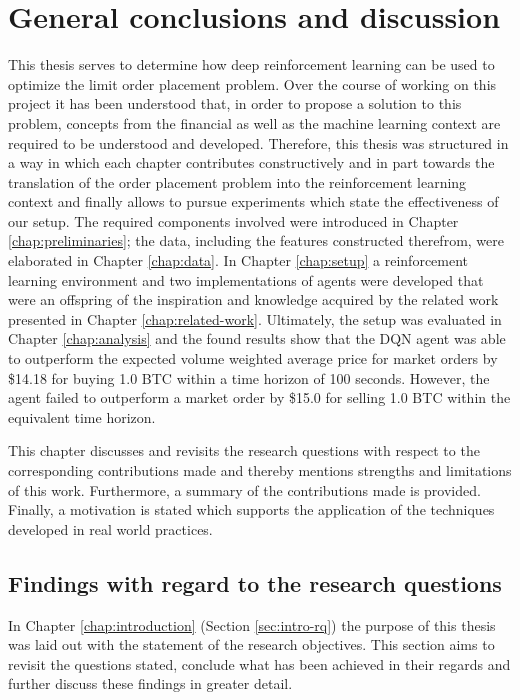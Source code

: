 \chapter{General conclusions and discussion}
\label{chap:discussion}

This thesis serves to determine how deep reinforcement learning can be used to optimize the limit order placement problem.
Over the course of working on this project it has been understood that, in order to propose a solution to this problem, concepts from the financial as well as the machine learning context are required to be understood and developed.
Therefore, this thesis was structured in a way in which each chapter contributes constructively and in part towards the translation of the order placement problem into the reinforcement learning context and finally allows to pursue experiments which state the effectiveness of our setup.
The required components involved were introduced in Chapter \ref{chap:preliminaries}; the data, including the features constructed therefrom, were elaborated in Chapter \ref{chap:data}.
In Chapter \ref{chap:setup} a reinforcement learning environment and two implementations of agents were developed that were an offspring of the inspiration and knowledge acquired by the related work presented in Chapter \ref{chap:related-work}.
Ultimately, the setup was evaluated in Chapter \ref{chap:analysis} and the found results show that the DQN agent was able to outperform the expected volume weighted average price for market orders by \$14.18 for buying 1.0 BTC within a time horizon of 100 seconds.
However, the agent failed to outperform a market order by \$15.0 for selling 1.0 BTC within the equivalent time horizon.

This chapter discusses and revisits the research questions with respect to the corresponding contributions made and thereby mentions strengths and limitations of this work.
Furthermore, a summary of the contributions made is provided.
Finally, a motivation is stated which supports the application of the techniques developed in real world practices.

\section{Findings with regard to the research questions}

In Chapter \ref{chap:introduction} (Section \ref{sec:intro-rq}) the purpose of this thesis was laid out with the statement of the research objectives.
This section aims to revisit the questions stated, conclude what has been achieved in their regards and further discuss these findings in greater detail.

